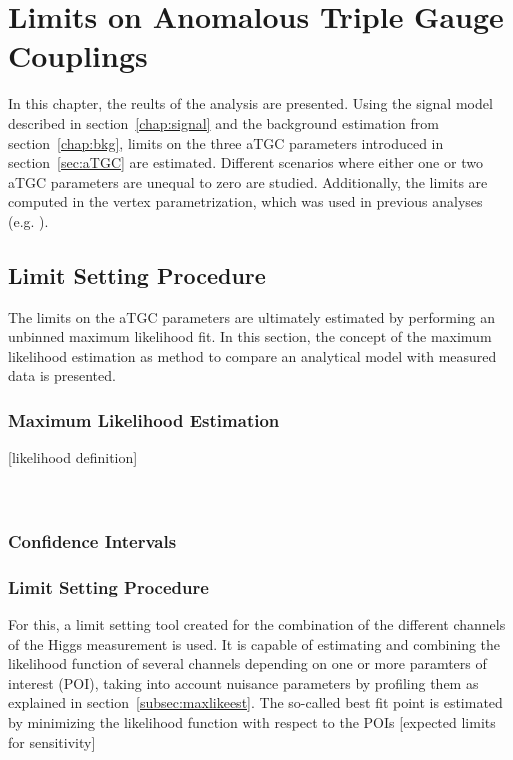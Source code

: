 \chapter{Limits on Anomalous Triple Gauge Couplings}
\label{chap:LimitsonATGCs}


In this chapter, the reults of the analysis are presented. Using the signal model described in section~\ref{chap:signal} and the background estimation from section~\ref{chap:bkg}, limits on the three aTGC parameters introduced in section~\ref{sec:aTGC} are estimated. Different scenarios where either one or two aTGC parameters are unequal to zero are studied. Additionally, the limits are computed in the vertex parametrization, which was used in previous analyses (e.g. \cite{aTGC1,aTGC2}).


\section{Limit Setting Procedure}
The limits on the aTGC parameters are ultimately estimated by performing an unbinned maximum likelihood fit. In this section, the concept of the maximum likelihood estimation as method to compare an analytical model with measured data is presented. 
\subsection{Maximum Likelihood Estimation}
[likelihood definition]\\
[log likelihood]\\
[profiling]\\
\subsection{Confidence Intervals}
\subsection{Limit Setting Procedure}
For this, a limit setting tool \cite{combine} created for the combination of the different channels of the Higgs measurement \cite{higgs_comb} is used. It is capable of estimating and combining the likelihood function of several channels depending on one or more paramters of interest (POI), taking into account nuisance parameters by profiling them as explained in section~\ref{subsec:maxlikeest}. The so-called best fit point is estimated by minimizing the likelihood function with respect to the POIs
[expected limits for sensitivity]

